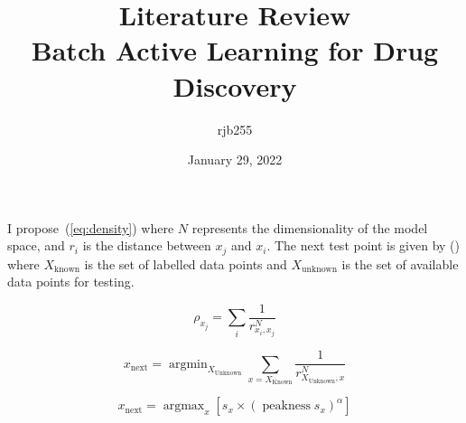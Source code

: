 \documentclass[a4paper, english]{article}
\DeclareMathOperator*{\argmax}{argmax}
\DeclareMathOperator*{\argmin}{argmin}
\DeclareMathOperator*{\peak}{peakness}
\begin{document}
\title{\Large{\textbf{Literature Review}}\\Batch Active Learning for Drug Discovery}
\author{rjb255}
\date{January 29, 2022}

\maketitle

\begin{abstract}
    \blindtext[1]{}
\end{abstract}



I propose~(\ref{eq:density}) where $N$ represents the dimensionality of the model space, and $r_i$ is the distance between $x_j$ and $x_i$. The next test point is given by () where $X_\mathrm{known}$ is the set of labelled data points and $X_\mathrm{unknown}$ is the set of available data points for testing.

\begin{equation}
    \label{eq:density}
    \rho_{x_j}=\sum_i{\frac{1}{r_{x_i,x_j}^N}}
\end{equation}

\begin{equation}
    x_\mathrm{next}=\argmin_{X_\mathrm{Unknown}}{\sum_{x=X_\mathrm{Known}}{\frac{1}{r_{X_\mathrm{Unknown},x}^N}}}
\end{equation}

\begin{equation*}
    {x_\mathrm{next} = \argmax_x{\left[s_{x}\times{}{\left(\peak{s_x}\right)}^\alpha\right]}}
\end{equation*}
\end{document}

